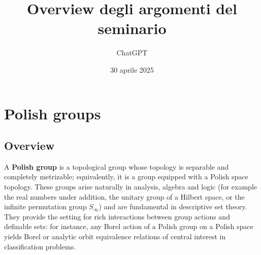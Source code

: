 \documentclass[11pt]{article}
\author{ChatGPT}
\date{30 aprile 2025}
\title{Overview degli argomenti del seminario}
\begin{document}
\maketitle
\section{Polish groups}
\label{polish-groups}
\subsection{Overview}
\label{overview}
A \textbf{Polish group} is a topological group whose topology is separable and
completely metrizable; equivalently, it is a group equipped with a
Polish space topology. These groups arise naturally in analysis, algebra
and logic (for example the real numbers under addition, the unitary
group of a Hilbert space, or the infinite permutation group
\(S_\infty\)) and are fundamental in descriptive set theory. They
provide the setting for rich interactions between group actions and
definable sets: for instance, any Borel action of a Polish group on a
Polish space yields Borel or analytic orbit equivalence relations of
central interest in classification problems.
\end{document}
